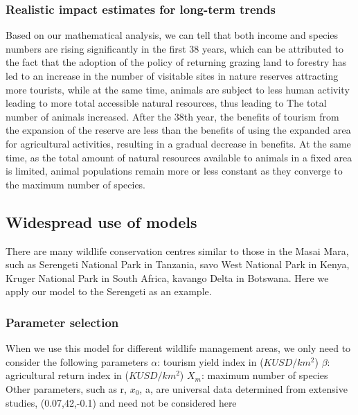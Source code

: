 \documentclass{mcmthesis}
\numberwithin{figure}{section}
\numberwithin{table}{section}
\numberwithin{equation}{section}
\begin{document}
\subsubsection{Realistic impact estimates for long-term trends}

Based on our mathematical analysis, we can tell that both income and species numbers are rising significantly in the first 38 years, which can be attributed to the fact that the adoption of the policy of returning grazing land to forestry has led to an increase in the number of visitable sites in nature reserves attracting more tourists, while at the same time, animals are subject to less human activity leading to more total accessible natural resources, thus leading to The total number of animals increased. After the 38th year, the benefits of tourism from the expansion of the reserve are less than the benefits of using the expanded area for agricultural activities, resulting in a gradual decrease in benefits. At the same time, as the total amount of natural resources available to animals in a fixed area is limited, animal populations remain more or less constant as they converge to the maximum number of species.

\subsection{Widespread use of models}

There are many wildlife conservation centres similar to those in the Masai Mara, such as Serengeti National Park in Tanzania, savo West National Park in Kenya, Kruger National Park in South Africa, kavango Delta in Botswana.
Here we apply our model to the Serengeti as an example.



\subsubsection{Parameter selection} 
When we use this model for different wildlife management areas, we only need to consider the following parameters
$\alpha$: tourism yield index in ($KUSD/km^2$)
$\beta$: agricultural return index in ($KUSD/km^2$)
$X_m$: maximum number of species
Other parameters, such as r, $x_0$, a, are universal data determined from extensive studies, (0.07,42,-0.1) and need not be considered here
\end{document}
